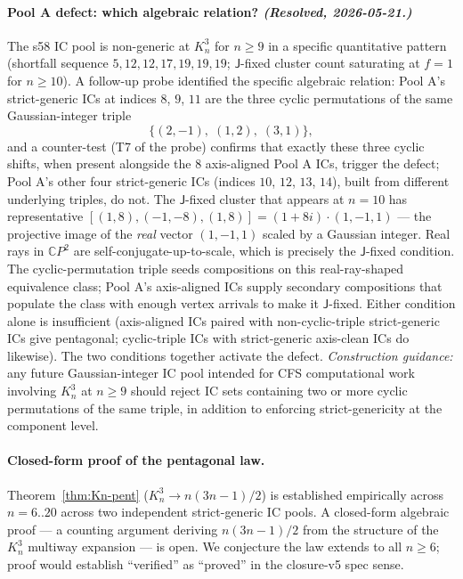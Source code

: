 \documentclass[12pt,a4paper]{article}
\theoremstyle{definition}
\theoremstyle{remark}
\newcommand{\bC}{\mathbb{C}}
\newcommand{\Kn}{K_n^3}
\newcommand{\Jconj}{\mathsf{J}}             %
\begin{document}
\paragraph{Pool A defect: which algebraic relation? \emph{(Resolved,
2026-05-21.)}}
The s58 IC pool is non-generic at $\Kn$ for $n \ge 9$ in a specific
quantitative pattern (shortfall sequence $5, 12, 12, 17, 19, 19, 19$;
$\Jconj$-fixed cluster count saturating at $f = 1$ for $n \ge 10$).
A follow-up probe \cite{closure-v5-pool-a-defect} identified the
specific algebraic relation: Pool A's strict-generic ICs at indices
$8$, $9$, $11$ are the three cyclic permutations of the same
Gaussian-integer triple
\[
\{ (2,-1),\; (1,2),\; (3,1) \},
\]
and a counter-test (T7 of the probe) confirms that exactly these three
cyclic shifts, when present alongside the $8$ axis-aligned Pool A ICs,
trigger the defect; Pool A's other four strict-generic ICs (indices
$10$, $12$, $13$, $14$), built from different underlying triples, do
not. The $\Jconj$-fixed cluster that appears at $n = 10$ has
representative $[(1, 8), (-1, -8), (1, 8)] = (1+8i) \cdot (1, -1, 1)$
--- the projective image of the \emph{real} vector $(1, -1, 1)$ scaled
by a Gaussian integer. Real rays in $\bC P^2$ are
self-conjugate-up-to-scale, which is precisely the $\Jconj$-fixed
condition. The cyclic-permutation triple seeds compositions on this
real-ray-shaped equivalence class; Pool A's axis-aligned ICs supply
secondary compositions that populate the class with enough vertex
arrivals to make it $\Jconj$-fixed. Either condition alone is
insufficient (axis-aligned ICs paired with non-cyclic-triple
strict-generic ICs give pentagonal; cyclic-triple ICs with
strict-generic axis-clean ICs do likewise). The two conditions
together activate the defect. \emph{Construction guidance:} any
future Gaussian-integer IC pool intended for CFS computational work
involving $\Kn$ at $n \ge 9$ should reject IC sets containing two or
more cyclic permutations of the same triple, in addition to enforcing
strict-genericity at the component level.

\paragraph{Closed-form proof of the pentagonal law.}
Theorem~\ref{thm:Kn-pent} ($\Kn \to n(3n{-}1)/2$) is established
empirically across $n = 6..20$ across two independent strict-generic
IC pools. A closed-form algebraic proof --- a counting argument
deriving $n(3n{-}1)/2$ from the structure of the $\Kn$ multiway
expansion --- is open. We conjecture the law extends to all $n \ge 6$;
proof would establish ``verified'' as ``proved'' in the
closure-v5 spec sense.
\end{document}
